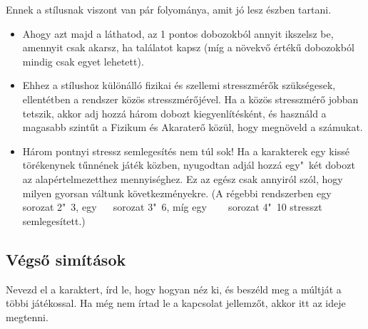 Ennek a stílusnak viszont van pár folyománya, amit jó lesz észben tartani.

\begin{itemize}
    \item Ahogy azt majd a  láthatod, az 1 pontos dobozokból annyit ikszelsz be, amennyit csak akarsz, ha találatot kapsz (míg a növekvő értékű dobozokból mindig csak egyet lehetett).
    \item Ehhez a stílushoz különálló fizikai és szellemi stresszmérők szükségesek, ellentétben a  rendszer közös stresszmérőjével. Ha a közös stresszmérő jobban tetszik, akkor adj hozzá három dobozt kiegyenlítésként, és használd a magasabb szintűt a Fizikum és Akaraterő közül, hogy megnöveld a számukat.
    \item Három pontnyi stressz semlegesítés nem túl sok! Ha a karakterek egy kissé törékenynek tűnnének játék közben, nyugodtan adjál hozzá egy"~két dobozt az alapértelmezetthez mennyiséghez. Ez az egész csak annyiról szól, hogy milyen gyorsan váltunk következményekre. (A régebbi rendszerben egy ~ sorozat 2"~3, egy ~~ sorozat 3"~6, míg egy ~~~ sorozat 4"~10 stresszt semlegesített.)
\end{itemize}

\subsection{Végső simítások}

Nevezd el a karaktert, írd le, hogy hogyan néz ki, és beszéld meg a múltját a többi játékossal. Ha még nem írtad le a kapcsolat jellemzőt, akkor itt az ideje megtenni.
